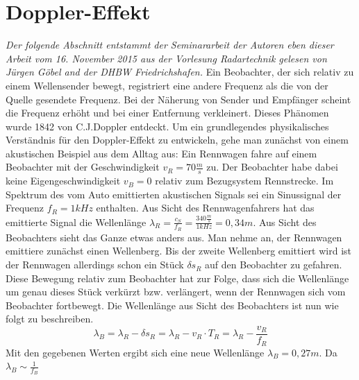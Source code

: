 \section{Doppler-Effekt}
\textit{Der folgende Abschnitt entstammt der Seminararbeit der Autoren eben dieser Arbeit vom 16. November 2015 aus der Vorlesung Radartechnik gelesen von Jürgen Göbel and der DHBW Friedrichshafen.} 
\newpar
Ein Beobachter, der sich relativ zu einem Wellensender bewegt, registriert 
eine andere Frequenz als die von der Quelle gesendete Frequenz. Bei der 
Näherung von Sender und Empfänger scheint die Frequenz erhöht und bei einer 
Entfernung verkleinert. Dieses Phänomen wurde 1842 von C.J.Doppler entdeckt. 
\newpar
Um ein grundlegendes  physikalisches Verständnis für den Doppler-Effekt zu entwickeln, 
gehe man zunächst von einem akustischen Beispiel aus dem Alltag aus: Ein Rennwagen fahre auf einem Beobachter 
mit der Geschwindigkeit \begin{math}v_R=70 \frac{m}{s}\end{math} zu. Der Beobachter habe dabei 
keine Eigengeschwindigkeit \begin{math}v_B=0 \end{math} relativ zum Bezugsystem Rennstrecke. Im 
Spektrum des vom Auto emittierten akustischen Signals sei ein Sinussignal der Frequenz \begin{math}f_R=1kHz\end{math} 
enthalten. Aus Sicht des Rennwagenfahrers hat das emittierte Signal die Wellenlänge
\begin{math}\lambda_R=\frac{c_S}{f_R}=\frac{340\frac{m}{s}}{1kHz}=0,34m\end{math}.
Aus Sicht des Beobachters sieht das Ganze etwas anders aus. 
Man nehme an, der Rennwagen emittiere zunächst einen Wellenberg.
Bis der zweite Wellenberg emittiert wird ist der Rennwagen allerdings schon ein Stück \begin{math}\delta s_R\end{math} auf den Beobachter zu gefahren. Diese Bewegung relativ
zum Beobachter hat zur Folge, dass sich die Wellenlänge um genau dieses Stück verkürzt bzw. verlängert, wenn der Rennwagen sich vom Beobachter fortbewegt.
Die Wellenlänge aus Sicht des Beobachters ist nun wie folgt zu beschreiben.
\begin{equation}
\label{lambda_b}
\lambda_B=\lambda_R -\delta s_{R}=\lambda_R - v_R \cdot T_{R}=\lambda_R - \frac{v_R}{f_{R}}
\end{equation} 
Mit den gegebenen Werten ergibt sich eine neue Wellenlänge \begin{math}{\lambda_B=0,27m} \end{math}. Da \begin{math}{\lambda_B \sim \frac{1}{f_B}} \end{math}  
